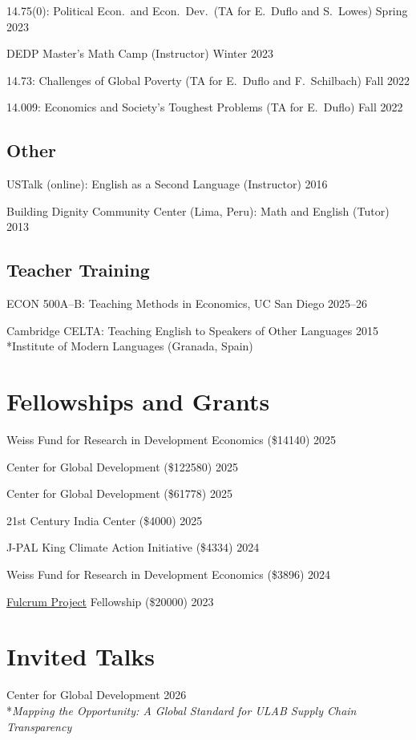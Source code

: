 \documentclass[12pt]{article}
\newcommand{\indentedline}[1]{%
    \\*\setlength{\parindent}{2em}\indent#1\setlength{\parindent}{0pt}%
    \vspace{0.5\baselineskip}%
}
\begin{document}
14.75(0): Political Econ.\ and Econ.\ Dev.\ (TA for E.\ Duflo and S.\ Lowes) \hfill Spring 2023

DEDP Master's Math Camp (Instructor) \hfill Winter 2023

14.73: Challenges of Global Poverty (TA for E.\ Duflo and F.\ Schilbach) \hfill Fall 2022

14.009: Economics and Society's Toughest Problems (TA for E.\ Duflo) \hfill Fall 2022

\subsection*{\small Other}

USTalk (online): English as a Second Language (Instructor) \hfill 2016

Building Dignity Community Center (Lima, Peru): Math and English (Tutor) \hfill 2013

\subsection*{\small Teacher Training}

ECON 500A--B: Teaching Methods in Economics, UC San Diego \hfill 2025--26

Cambridge CELTA: Teaching English to Speakers of Other Languages \hfill 2015
\indentedline{Institute of Modern Languages (Granada, Spain)}

\section*{Fellowships and Grants}

Weiss Fund for Research in Development Economics (\$\num{14140}) \hfill 2025

Center for Global Development (\$\num{122580}) \hfill 2025

Center for Global Development (\$\num{61778}) \hfill 2025

21st Century India Center (\$\num{4000}) \hfill 2025

J-PAL King Climate Action Initiative (\$\num{4334}) \hfill 2024

Weiss Fund for Research in Development Economics (\$\num{3896}) \hfill 2024

\href{https://econweb.ucsd.edu/~pniehaus/fulcrumproject/}{Fulcrum Project} Fellowship (\$\num{20000}) \hfill 2023

\section*{Invited Talks}
Center for Global Development \hfill 2026
\indentedline{\textit{Mapping the Opportunity: A Global Standard for ULAB Supply Chain Transparency}}
\end{document}
